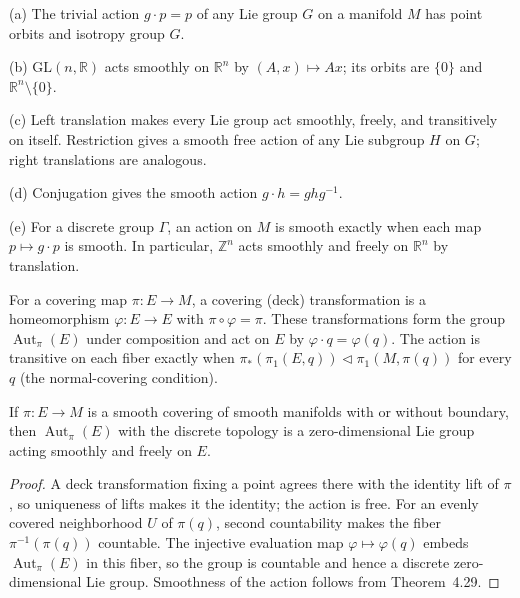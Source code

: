 \begin{example}
\label{ex:7-22}




(a) The trivial action $g\cdot p=p$ of any Lie group $G$ on a manifold $M$ has point orbits and isotropy group $G$.

(b) $\mathrm{GL}(n,\mathbb R)$ acts smoothly on $\mathbb R^n$ by $(A,x)\mapsto Ax$; its orbits are $\{0\}$ and $\mathbb R^n\setminus\{0\}$.

(c) Left translation makes every Lie group act smoothly, freely, and transitively on itself. Restriction gives a smooth free action of any Lie subgroup $H$ on $G$; right translations are analogous.

(d) Conjugation gives the smooth action $g\cdot h=ghg^{-1}$.

(e) For a discrete group $\Gamma$, an action on $M$ is smooth exactly when each map $p\mapsto g\cdot p$ is smooth. In particular, $\mathbb Z^n$ acts smoothly and freely on $\mathbb R^n$ by translation.
\end{example}

\begin{definition}
\label{def:7-50-extra-2}




For a covering map $\pi:E\to M$, a covering (deck) transformation is a
homeomorphism $\varphi:E\to E$ with $\pi\circ\varphi=\pi$. These transformations
form the group $\operatorname{Aut}_\pi(E)$ under composition and act on $E$ by
$\varphi\cdot q=\varphi(q)$. The action is transitive on each fiber exactly
when $\pi_*(\pi_1(E,q))\triangleleft\pi_1(M,\pi(q))$ for every $q$ (the
normal-covering condition).
\end{definition}

\begin{proposition}
\label{prop:7-23}




If $\pi:E\to M$ is a smooth covering of smooth manifolds with or without
boundary, then $\operatorname{Aut}_\pi(E)$ with the discrete topology is a
zero-dimensional Lie group acting smoothly and freely on $E$.
\end{proposition}

\begin{proof}

\sketch A deck transformation fixing a point agrees there with the identity lift of $\pi$, so uniqueness of lifts makes it the identity; the action is free. For an evenly covered neighborhood $U$ of $\pi(q)$, second countability makes the fiber $\pi^{-1}(\pi(q))$ countable. The injective evaluation map $\varphi\mapsto\varphi(q)$ embeds $\operatorname{Aut}_\pi(E)$ in this fiber, so the group is countable and hence a discrete zero-dimensional Lie group. Smoothness of the action follows from Theorem~4.29.
\end{proof}

